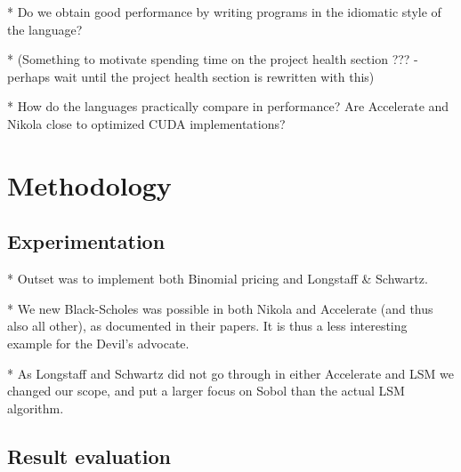 * Do we obtain good performance by writing programs in the idiomatic
  style of the language?

* (Something to motivate spending time on the project health section
  ??? - perhaps wait until the project health section is rewritten
  with this)

* How do the languages practically compare in performance? Are
  Accelerate and Nikola close to optimized CUDA implementations?


\section{Methodology}
\subsection{Experimentation}

* Outset was to implement both Binomial pricing and Longstaff \&
Schwartz.

* We new Black-Scholes was possible in both Nikola and Accelerate (and
thus also all other), as documented in their papers. It is thus a less
interesting example for the Devil's advocate.

* As Longstaff and Schwartz did not go through in either Accelerate
and LSM we changed our scope, and put a larger focus on Sobol than the
actual LSM algorithm.

\subsection{Result evaluation}




